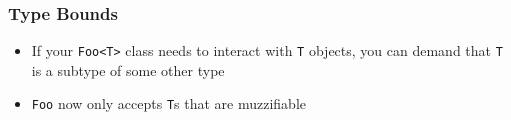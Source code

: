 \begin{frame}
  \frametitle{Type Bounds}
  \begin{itemize}
    \item If your \texttt{Foo<T>} class needs to interact with \texttt{T} objects,
          you can demand that \texttt{T} is a subtype of some other type
    \item \texttt{Foo} now only accepts \texttt{T}s that are muzzifiable
  \end{itemize}
\end{frame}

